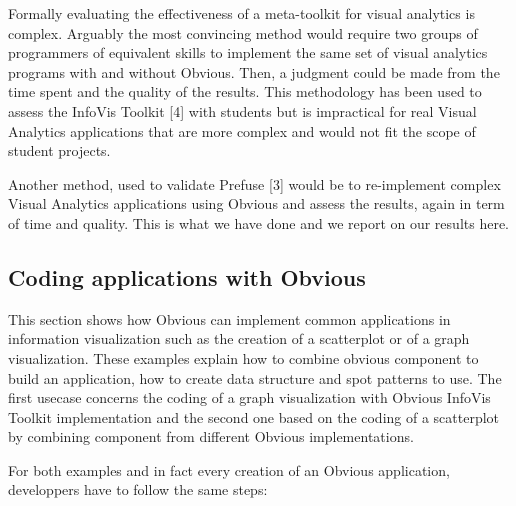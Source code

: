 Formally evaluating the effectiveness of a meta-toolkit for visual analytics is complex. Arguably the most convincing method would require two groups of programmers of equivalent skills to implement the same set of visual analytics programs with and without Obvious. Then, a judgment could be made from the time spent and the quality of the results. This methodology has been used to assess the InfoVis Toolkit [4] with students but is impractical for real Visual Analytics applications that are more complex and would not fit the scope of student projects.

Another method, used to validate Prefuse [3] would be to re-implement complex Visual Analytics applications using Obvious and assess the results, again in term of time and quality. This is what we have done and we report on our results here.

\subsection{Coding applications with Obvious}

This section shows how Obvious can implement common applications in information visualization such as the creation of a scatterplot or of a graph visualization. These examples explain how to combine obvious component to build an application, how to create data structure and spot patterns to use. The first usecase concerns the coding of a graph visualization with Obvious InfoVis Toolkit implementation and the second one based on the coding of a scatterplot by combining component from different Obvious implementations.

For both examples and in fact every creation of an Obvious application, developpers have to follow the same steps:

